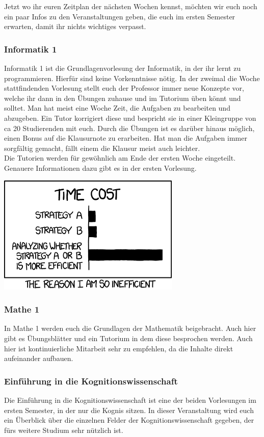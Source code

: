 Jetzt wo ihr euren Zeitplan der nächsten Wochen kennst, möchten wir euch noch ein paar Infos zu den Veranstaltungen geben, die euch im ersten Semester erwarten, damit ihr nichts wichtiges verpasst.

\subsubsection*{Informatik 1}
Informatik 1 ist die Grundlagenvorlesung der Informatik, in der ihr lernt zu programmieren. Hierfür sind keine Vorkenntnisse nötig. In der zweimal die Woche stattfindenden Vorlesung stellt euch der Professor immer neue Konzepte vor, welche ihr dann in den Übungen zuhause und im Tutorium üben könnt und solltet. Man hat meist eine Woche Zeit, die Aufgaben zu bearbeiten und abzugeben. Ein Tutor korrigiert diese und bespricht sie in einer Kleingruppe von ca 20 Studierenden mit euch. Durch die Übungen ist es darüber hinaus möglich, einen Bonus auf die Klausurnote zu erarbeiten. Hat man die Aufgaben immer sorgfältig gemacht, fällt einem die Klausur meist auch leichter.\\
Die Tutorien werden für gewöhnlich am Ende der ersten Woche eingeteilt. Genauere Informationen dazu gibt es in der ersten Vorlesung.

\begin{center}
\includegraphics[width=0.5\hsize]{info/xkcd/efficiency.png}
\end{center}

\subsubsection*{Mathe 1}
In Mathe 1 werden euch die Grundlagen der Mathematik beigebracht. Auch hier gibt es Übungsblätter und ein Tutorium in dem diese besprochen werden. Auch hier ist kontinuierliche Mitarbeit sehr zu empfehlen, da die Inhalte direkt aufeinander aufbauen.

\subsubsection*{Einführung in die Kognitionswissenschaft}
Die Einführung in die Kognitionswissenschaft ist eine der beiden Vorlesungen im ersten Semester, in der nur die Kognis sitzen. In dieser Veranstaltung wird euch ein Überblick über die einzelnen Felder der Kognitionswissenschaft gegeben, der fürs weitere Studium sehr nützlich ist.

